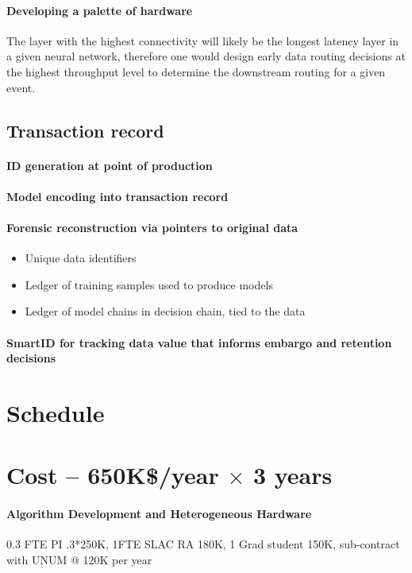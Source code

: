 \documentclass{article}
\begin{document}
\paragraph{Developing a palette of hardware}
The layer with the highest connectivity will likely be the longest latency layer in a given neural network, therefore one would design early data routing decisions at the highest throughput level to determine the downstream routing for a given event.  

\subsection{Transaction record}
\paragraph{ID generation at point of production}
\paragraph{Model encoding into transaction record}
\paragraph{Forensic reconstruction via pointers to original data}
\begin{itemize}
\item Unique data identifiers
\item Ledger of training samples used to produce models
\item Ledger of model chains in decision chain, tied to the data
\end{itemize}
\paragraph{SmartID for tracking data value that informs embargo and retention decisions}

\section{Schedule}

\section{Cost -- 650K\$/year $\times$ 3 years}
\paragraph{Algorithm Development and Heterogeneous Hardware} 0.3 FTE PI .3*250K, 1FTE SLAC RA 180K, 1 Grad student 150K, sub-contract with UNUM @ 120K per year
\end{document}
